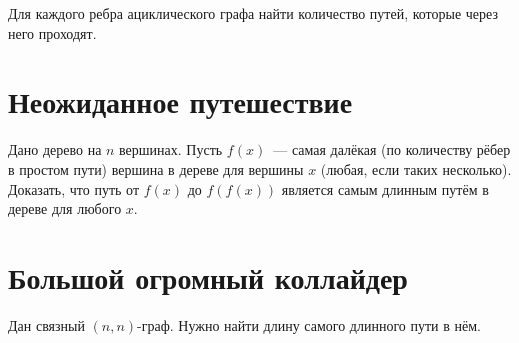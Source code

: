 \documentclass[addpoints]{exam}
\begin{document}
Для каждого ребра ациклического графа найти количество путей, которые через него проходят.

\section{Неожиданное путешествие}

Дано дерево на $n$ вершинах. Пусть $f(x)$~--- самая далёкая (по количеству рёбер в простом пути) вершина в дереве для вершины $x$ (любая, если таких несколько). Доказать, что путь от $f(x)$ до $f(f(x))$ является самым длинным путём в дереве для любого $x$.

\section{Большой огромный коллайдер}

Дан связный $(n,n)$-граф. Нужно найти длину самого длинного пути в нём.
\end{document}
